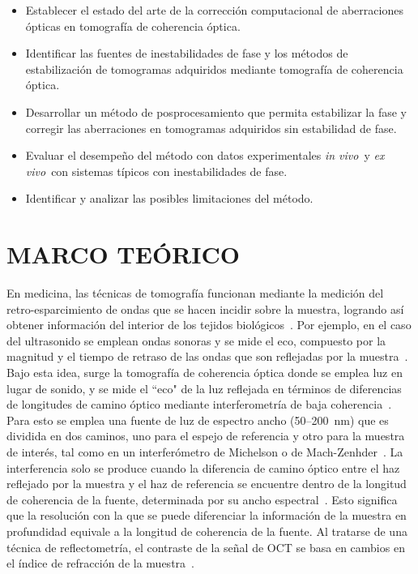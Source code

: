 \documentclass[letter, 12 pt]{article}
\newcommand{\invi}{\textit{in vivo}\ }
\newcommand{\exvi}{\textit{ex vivo}\ }
\begin{document}
\begin{itemize}

    \item Establecer el estado del arte de la corrección computacional de aberraciones ópticas en tomografía de coherencia óptica.

    \item Identificar las fuentes de inestabilidades de fase y los métodos de estabilización de tomogramas adquiridos mediante tomografía de coherencia óptica.

    \item Desarrollar un método de posprocesamiento que permita estabilizar la fase y corregir las aberraciones en tomogramas adquiridos sin estabilidad de fase.

    \item Evaluar el desempeño del método con datos experimentales \invi y \exvi con sistemas típicos con inestabilidades de fase.

    \item Identificar y analizar las posibles limitaciones del método.

\end{itemize}



\section{MARCO TEÓRICO} \label{sec:teoria}

En medicina, las técnicas de tomografía funcionan mediante la medición del retro-esparcimiento de ondas que se hacen incidir sobre la muestra, logrando así obtener información del interior de los tejidos biológicos~\cite{guy2005}. Por ejemplo, en el caso del ultrasonido se emplean ondas sonoras y se mide el eco, compuesto por la magnitud y el tiempo de retraso de las ondas que son reflejadas por la muestra~\cite{szabo2004}. Bajo esta idea, surge la tomografía de coherencia óptica donde se emplea luz en lugar de sonido, y se mide el ``eco" de la luz reflejada en términos de diferencias de longitudes de camino óptico mediante interferometría de baja coherencia~\cite{huang1991}. Para esto se emplea una fuente de luz de espectro ancho (50--200~nm) que es dividida en dos caminos, uno para el espejo de referencia y otro para la muestra de interés, tal como en un interferómetro de Michelson o de Mach-Zenhder~\cite{drexler2015}. La interferencia solo se produce cuando la diferencia de camino óptico entre el haz reflejado por la muestra y el haz de referencia se encuentre dentro de la longitud de coherencia de la fuente, determinada por su ancho espectral~\cite{huang1991}. Esto significa que la resolución con la que se puede diferenciar la información de la muestra en profundidad equivale a la longitud de coherencia de la fuente. Al tratarse de una técnica de reflectometría, el contraste de la señal de OCT se basa en cambios en el índice de refracción de la muestra~\cite{drexler2015}. \\
\end{document}
